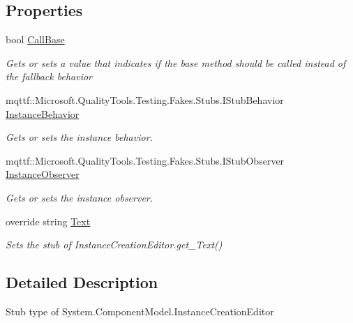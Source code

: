 \subsection*{Properties}
\begin{DoxyCompactItemize}
\item 
bool \hyperlink{class_system_1_1_component_model_1_1_fakes_1_1_stub_instance_creation_editor_a4e3b9bc216603a8837eba26720f0f774}{Call\-Base}
\begin{DoxyCompactList}\small\item\em Gets or sets a value that indicates if the base method should be called instead of the fallback behavior\end{DoxyCompactList}\item 
mqttf\-::\-Microsoft.\-Quality\-Tools.\-Testing.\-Fakes.\-Stubs.\-I\-Stub\-Behavior \hyperlink{class_system_1_1_component_model_1_1_fakes_1_1_stub_instance_creation_editor_ac28b8b3055afc1bf1785bc66fd3fce31}{Instance\-Behavior}
\begin{DoxyCompactList}\small\item\em Gets or sets the instance behavior.\end{DoxyCompactList}\item 
mqttf\-::\-Microsoft.\-Quality\-Tools.\-Testing.\-Fakes.\-Stubs.\-I\-Stub\-Observer \hyperlink{class_system_1_1_component_model_1_1_fakes_1_1_stub_instance_creation_editor_a391ff7dbb12faf1d1ab6a94ad10287f4}{Instance\-Observer}
\begin{DoxyCompactList}\small\item\em Gets or sets the instance observer.\end{DoxyCompactList}\item 
override string \hyperlink{class_system_1_1_component_model_1_1_fakes_1_1_stub_instance_creation_editor_ac0e303c73f458b7d648a1bdfae43ea83}{Text}
\begin{DoxyCompactList}\small\item\em Sets the stub of Instance\-Creation\-Editor.\-get\-\_\-\-Text()\end{DoxyCompactList}\end{DoxyCompactItemize}


\subsection{Detailed Description}
Stub type of System.\-Component\-Model.\-Instance\-Creation\-Editor



